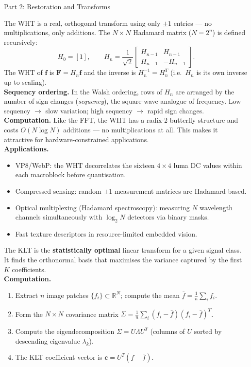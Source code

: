 \documentclass[letterpaper]{article}
\begin{document}
\begin{notes}{Part 2: Restoration and Transforms}

The WHT is a real, orthogonal transform using only $\pm1$ entries — no multiplications, only additions. The $N\times N$ Hadamard matrix ($N=2^n$) is defined recursively:
$$H_0 = [1], \qquad H_n = \frac{1}{\sqrt{2}}\begin{bmatrix}H_{n-1} & H_{n-1}\\H_{n-1} & -H_{n-1}\end{bmatrix}.$$
The WHT of $\mathbf{f}$ is $\mathbf{F} = H_n \mathbf{f}$ and the inverse is $H_n^{-1} = H_n^T$ (i.e.\ $H_n$ is its own inverse up to scaling).\\

\textbf{Sequency ordering.} In the Walsh ordering, rows of $H_n$ are arranged by the number of sign changes (\emph{sequency}), the square-wave analogue of frequency. Low sequency $\to$ slow variation; high sequency $\to$ rapid sign changes.\\

\textbf{Computation.} Like the FFT, the WHT has a radix-2 butterfly structure and costs $O(N\log N)$ additions — no multiplications at all. This makes it attractive for hardware-constrained applications.\\

\textbf{Applications.}
\begin{itemize}
    \item VP8/WebP: the WHT decorrelates the sixteen $4\times4$ luma DC values within each macroblock before quantisation.
    \item Compressed sensing: random $\pm1$ measurement matrices are Hadamard-based.
    \item Optical multiplexing (Hadamard spectroscopy): measuring $N$ wavelength channels simultaneously with $\log_2 N$ detectors via binary masks.
    \item Fast texture descriptors in resource-limited embedded vision.
\end{itemize}


The KLT is the \textbf{statistically optimal} linear transform for a given signal class. It finds the orthonormal basis that maximises the variance captured by the first $K$ coefficients.\\

\textbf{Computation.}
\begin{enumerate}
    \item Extract $n$ image patches $\{f_i\}\subset\mathbb{R}^N$; compute the mean $\bar{f} = \frac{1}{n}\sum_i f_i$.
    \item Form the $N\times N$ covariance matrix $\Sigma = \frac{1}{n}\sum_i (f_i-\bar{f})(f_i-\bar{f})^T$.
    \item Compute the eigendecomposition $\Sigma = U\Lambda U^T$ (columns of $U$ sorted by descending eigenvalue $\lambda_k$).
    \item The KLT coefficient vector is $\mathbf{c} = U^T(f - \bar{f})$.
\end{enumerate}


\end{notes}
\end{document}
